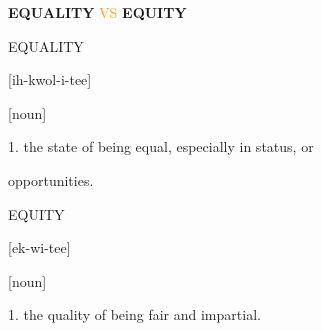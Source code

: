 \documentclass{beamer}
\begin{document}
\begin{frame}
    \centering
    \LARGE \textbf{EQUALITY} \textcolor{orange}{VS} \textbf{EQUITY}
\end{frame}

\begin{frame}
    \begin{center}
    \begin{minipage}{.5\textwidth}
        \LARGE{EQUALITY}
    \end{minipage}
    \begin{minipage}{.3\textwidth}
        \normalsize{[ih-kwol-i-tee]}
    \end{minipage}
    \vspace{.5cm}

    \hspace{-8cm} \normalsize{[noun]}\\
    \end{center}
    \hspace{.8cm} \normalsize{1. the state of being equal, especially in status, or}

    \hspace{.8cm} \normalsize{opportunities.}
    \vspace{.5cm}

    \begin{center}
    \begin{minipage}{.5\textwidth}
        \LARGE{EQUITY}
    \end{minipage}
    \begin{minipage}{.3\textwidth}
        \normalsize{[ek-wi-tee]}
    \end{minipage}
    \vspace{.5cm}

    \hspace{-8cm} \normalsize{[noun]}\\
    \end{center}
    \hspace{.8cm} \normalsize{1.  the quality of being fair and impartial.} \\ 
\end{frame}

\begin{frame}
    \begin{center}
        
    \end{center}
\end{frame}

\begin{frame}
    \begin{center}
        
    \end{center}
\end{frame}
\end{document}
